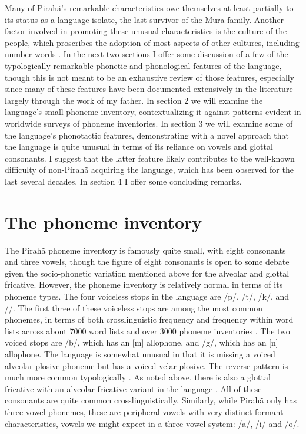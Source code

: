 \documentclass[output=paper,colorlinks,citecolor=brown
]{langscibook}
\begin{document}
    Many of Pirahã’s remarkable characteristics owe themselves at least partially to its status as a language isolate, the last survivor of the Mura family. Another factor involved in promoting these unusual characteristics is the culture of the people, which proscribes the adoption of most aspects of other cultures, including number words \citep{everett2005cultural}. In the next two sections I offer some discussion of a few of the typologically remarkable phonetic and phonological features of the language, though this is not meant to be an exhaustive review of those features, especially since many of these features have been documented extensively in the literature–largely through the work of my father. In section 2 we will examine the language’s small phoneme inventory, contextualizing it against patterns evident in worldwide surveys of phoneme inventories. In section 3 we will examine some of the language’s phonotactic features, demonstrating with a novel approach that the language is quite unusual in terms of its reliance on vowels and glottal consonants. I suggest that the latter feature likely contributes to the well-known difficulty of non-Pirahã acquiring the language, which has been observed for the last several decades. In section 4 I offer some concluding remarks. 


\section{The phoneme inventory}

    The Pirahã phoneme inventory is famously quite small, with eight consonants and three vowels, though the figure of eight consonants is open to some debate given the socio-phonetic variation mentioned above for the alveolar and glottal fricative. However, the phoneme inventory is relatively normal in terms of its phoneme types. The four voiceless stops in the language are /p/, /t/, /k/, and /{\textglotstop}/. The first three of these voiceless stops are among the most common phonemes, in terms of both crosslinguistic frequency and frequency within word lists across about 7000 word lists and over 3000 phoneme inventories \citep{everett2018similar, everett2021sounds}. The two voiced stops are /b/, which has an [m] allophone, and /g/, which has an [n] allophone. The language is somewhat unusual in that it is missing a voiced alveolar plosive phoneme but has a voiced velar plosive. The reverse pattern is much more common typologically \citep{everett2018global}. As noted above, there is also a glottal fricative with an alveolar fricative variant in the language \citep{everett1986piraha}. All of these consonants are quite common crosslinguistically. Similarly, while Pirahã only has three vowel phonemes, these are peripheral vowels with very distinct formant characteristics, vowels we might expect in a three-vowel system: /a/, /i/ and /o/.
\end{document}
